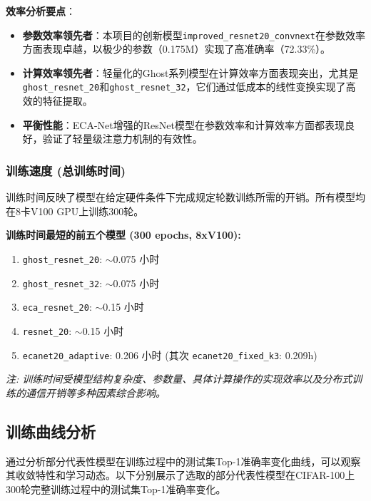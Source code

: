 \documentclass[a4paper]{article}
\begin{document}
\begin{description}
\textbf{效率分析要点}：
\begin{itemize}
    \item \textbf{参数效率领先者}：本项目的创新模型\texttt{improved\_resnet20\_convnext}在参数效率方面表现卓越，以极少的参数（0.175M）实现了高准确率（72.33\%）。
    \item \textbf{计算效率领先者}：轻量化的Ghost系列模型在计算效率方面表现突出，尤其是\texttt{ghost\_resnet\_20}和\texttt{ghost\_resnet\_32}，它们通过低成本的线性变换实现了高效的特征提取。
    \item \textbf{平衡性能}：ECA-Net增强的ResNet模型在参数效率和计算效率方面都表现良好，验证了轻量级注意力机制的有效性。
\end{itemize}

\subsubsection{训练速度 (总训练时间)}
训练时间反映了模型在给定硬件条件下完成规定轮数训练所需的开销。所有模型均在8卡V100 GPU上训练300轮。

\textbf{训练时间最短的前五个模型 (300 epochs, 8xV100):}
\begin{enumerate}
    \item \texttt{ghost\_resnet\_20}: $\sim$0.075 小时
    \item \texttt{ghost\_resnet\_32}: $\sim$0.075 小时
    \item \texttt{eca\_resnet\_20}: $\sim$0.15 小时
    \item \texttt{resnet\_20}: $\sim$0.15 小时
    \item \texttt{ecanet20\_adaptive}: 0.206 小时 (其次 \texttt{ecanet20\_fixed\_k3}: 0.209h)
\end{enumerate}
\textit{注: 训练时间受模型结构复杂度、参数量、具体计算操作的实现效率以及分布式训练的通信开销等多种因素综合影响。}

\subsection{训练曲线分析}
通过分析部分代表性模型在训练过程中的测试集Top-1准确率变化曲线，可以观察其收敛特性和学习动态。以下分别展示了选取的部分代表性模型在CIFAR-100上300轮完整训练过程中的测试集Top-1准确率变化。


\end{description}
\end{document}
